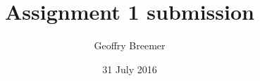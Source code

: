 \newcommand{\usqcoursecode}{MAT8190}
\newcommand{\usqcoursedescription}{Numerical Computation}
\title{Assignment 1 submission}
\newcommand{\usqsubtitle}{Selected exercises:\\Exercise 3.4 (Chapter 3) and exercise 7.5 (Chapter 7)}
\author{Geoffry Breemer}
\newcommand{\usqstudentnumber}{0061082147}
\newcommand{\usqstudentemail}{u1082147@umail.usq.edu.au}
\newcommand{\usqacademicyear}{2016}
\newcommand{\usqacademicsemester}{2}
\date{31 July 2016}
\newcommand{\usqpreparedfor}{Dr Harry Butler}
\newcommand{\usqpreparedforposition}{Senior Lecturer (Mathematics and Computing)}
\newcommand{\usqpreparedfororganisation}{School of Agricultural, Computational and Environmental Sciences}